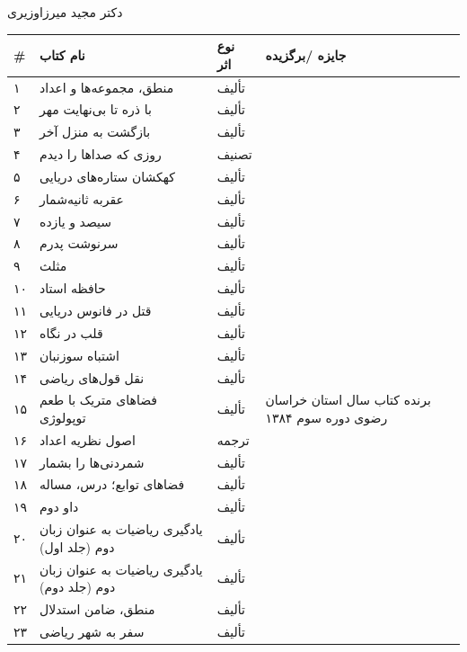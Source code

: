 \documentclass[
  letterpaper,
  DIV=11,
  numbers=noendperiod]{scrreprt}
\newcounter{none} %
\begin{document}
دکتر مجید میرزاوزیری

{\def\LTcaptype{none} %
\begin{longtable}[]{@{}
  >{\raggedright\arraybackslash}p{}
  >{\raggedright\arraybackslash}p{}
  >{\raggedright\arraybackslash}p{}
  >{\raggedright\arraybackslash}p{}@{}}
\toprule\noalign{}
\begin{minipage}[b]{\linewidth}\raggedright
\#
\end{minipage} & \begin{minipage}[b]{\linewidth}\raggedright
نام کتاب
\end{minipage} & \begin{minipage}[b]{\linewidth}\raggedright
نوع اثر
\end{minipage} & \begin{minipage}[b]{\linewidth}\raggedright
جایزه /برگزیده
\end{minipage} \\
\midrule\noalign{}
\endhead
\bottomrule\noalign{}
\endlastfoot
۱ & منطق، مجموعه‌ها و اعداد & تألیف & \\
۲ & با ذره تا بی‌نهایت مهر & تألیف & \\
۳ & بازگشت به منزل آخر & تألیف & \\
۴ & روزی که صداها را دیدم & تصنیف & \\
۵ & کهکشان ستاره‌های دریایی & تألیف & \\
۶ & عقربه ثانیه‌شمار & تألیف & \\
۷ & سیصد و یازده & تألیف & \\
۸ & سرنوشت پدرم & تألیف & \\
۹ & مثلث & تألیف & \\
۱۰ & حافظه استاد & تألیف & \\
۱۱ & قتل در فانوس دریایی & تألیف & \\
۱۲ & قلب در نگاه & تألیف & \\
۱۳ & اشتباه سوزنبان & تألیف & \\
۱۴ & نقل قول‌های ریاضی & تألیف & \\
۱۵ & فضاهای متریک با طعم توپولوژی & تألیف & برنده کتاب سال استان خراسان
رضوی دوره سوم ۱۳۸۴ \\
۱۶ & اصول نظریه اعداد & ترجمه & \\
۱۷ & شمردنی‌ها را بشمار & تألیف & \\
۱۸ & فضاهای توابع؛ درس، مساله & تألیف & \\
۱۹ & داو دوم & تألیف & \\
۲۰ & یادگیری ریاضیات به عنوان زبان دوم (جلد اول) & تألیف & \\
۲۱ & یادگیری ریاضیات به عنوان زبان دوم (جلد دوم) & تألیف & \\
۲۲ & منطق، ضامن استدلال & تألیف & \\
۲۳ & سفر به شهر ریاضی & تألیف & \\
\end{longtable}
}
\end{document}
